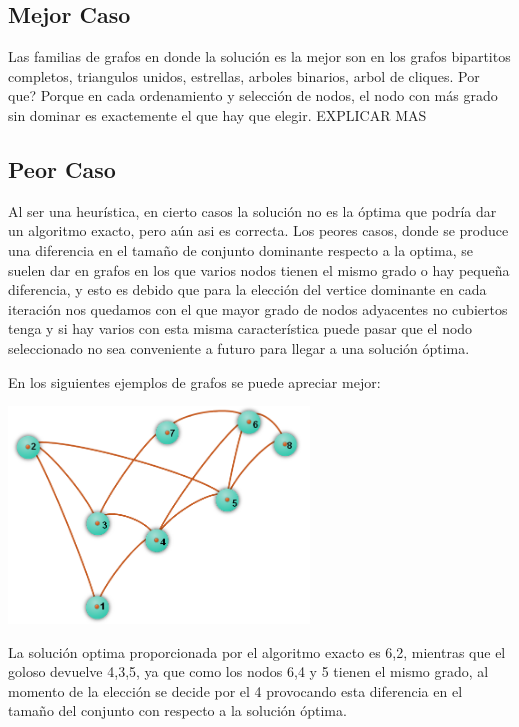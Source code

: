 \subsection{Mejor Caso}

Las familias de grafos en donde la solución es la mejor son en los grafos bipartitos completos, triangulos unidos, estrellas, arboles binarios, arbol de cliques. Por que? Porque en cada ordenamiento y selección de nodos, el nodo con más grado sin dominar es exactemente el que hay que elegir. EXPLICAR MAS

\subsection{Peor Caso}

Al ser una heurística, en cierto casos la solución no es la óptima que podría dar un algoritmo exacto, pero aún asi es correcta.
Los peores casos, donde se produce una diferencia en el tamaño de conjunto dominante respecto a la optima, se suelen dar en grafos en los que varios nodos tienen el mismo grado o hay pequeña diferencia, y esto es debido que para la elección del vertice dominante en cada iteración nos quedamos con el que mayor grado de nodos adyacentes no cubiertos tenga y si hay varios con esta misma característica puede pasar que el nodo seleccionado no sea conveniente a futuro para llegar a una solución óptima.

En los siguientes ejemplos de grafos se puede apreciar mejor:

\begin {center}
\includegraphics[width=8cm]{./graficos/grafo.png}
\end {center} 
La solución optima proporcionada por el algoritmo exacto es {6,2}, mientras que el goloso devuelve {4,3,5}, ya que como los nodos 6,4 y 5 tienen el mismo grado, al momento de la elección se decide por el 4 provocando esta diferencia en el tamaño del conjunto con respecto a la solución óptima.

